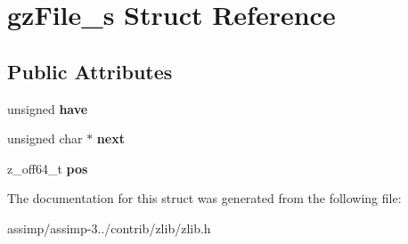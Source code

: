 \hypertarget{structgz_file__s}{\section{gz\+File\+\_\+s Struct Reference}
\label{structgz_file__s}
}
\subsection*{Public Attributes}
\begin{DoxyCompactItemize}
\item 
\hypertarget{structgz_file__s_abb96e208e17a991c09b4df6cefcc1c04}{unsigned {\bfseries have}}\label{structgz_file__s_abb96e208e17a991c09b4df6cefcc1c04}

\item 
\hypertarget{structgz_file__s_aa5e3e3da0143cde8f92ddfd6996d55fc}{unsigned char $\ast$ {\bfseries next}}\label{structgz_file__s_aa5e3e3da0143cde8f92ddfd6996d55fc}

\item 
\hypertarget{structgz_file__s_a98038b7edb4ab55ee321fa388afb687e}{z\+\_\+off64\+\_\+t {\bfseries pos}}\label{structgz_file__s_a98038b7edb4ab55ee321fa388afb687e}

\end{DoxyCompactItemize}


The documentation for this struct was generated from the following file\+:\begin{DoxyCompactItemize}
\item 
assimp/assimp-\/3../contrib/zlib/zlib.\+h\end{DoxyCompactItemize}
